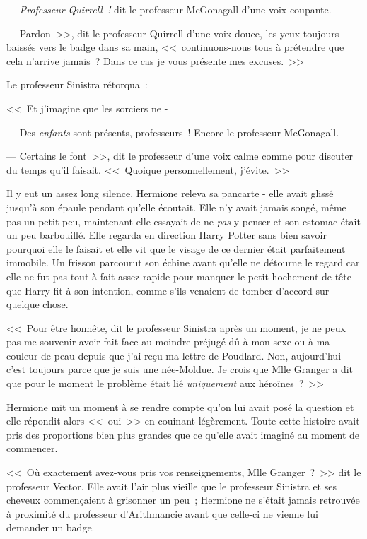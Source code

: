 --- \emph{Professeur Quirrell~!} dit le professeur McGonagall d'une voix coupante.

--- Pardon~>>, dit le professeur Quirrell d'une voix douce, les yeux toujours baissés vers le badge dans sa main, <<~continuons-nous tous à prétendre que cela n'arrive jamais~? Dans ce cas je vous présente mes excuses.~>>

Le professeur Sinistra rétorqua~:

<<~Et j'imagine que les sorciers ne -

--- Des \emph{enfants} sont présents, professeurs~! Encore le professeur McGonagall.

--- Certains le font~>>, dit le professeur d'une voix calme comme pour discuter du temps qu'il faisait. <<~Quoique personnellement, j'évite.~>>

Il y eut un assez long silence. Hermione releva sa pancarte - elle avait glissé jusqu'à son épaule pendant qu'elle écoutait. Elle n'y avait jamais songé, même pas un petit peu, maintenant elle essayait de ne \emph{pas} y penser et son estomac était un peu barbouillé. Elle regarda en direction Harry Potter sans bien savoir pourquoi elle le faisait et elle vit que le visage de ce dernier était parfaitement immobile. Un frisson parcourut son échine avant qu'elle ne détourne le regard car elle ne fut pas tout à fait assez rapide pour manquer le petit hochement de tête que Harry fit à son intention, comme s'ils venaient de tomber d'accord sur quelque chose.

<<~Pour être honnête, dit le professeur Sinistra après un moment, je ne peux pas me souvenir avoir fait face au moindre préjugé dû à mon sexe ou à ma couleur de peau depuis que j'ai reçu ma lettre de Poudlard. Non, aujourd'hui c'est toujours parce que je suis une née-Moldue. Je crois que Mlle Granger a dit que pour le moment le problème était lié \emph{uniquement} aux héroïnes~?~>>

Hermione mit un moment à se rendre compte qu'on lui avait posé la question et elle répondit alors <<~oui~>> en couinant légèrement. Toute cette histoire avait pris des proportions bien plus grandes que ce qu'elle avait imaginé au moment de commencer.

<<~Où exactement avez-vous pris vos renseignements, Mlle Granger~?~>> dit le professeur Vector. Elle avait l'air plus vieille que le professeur Sinistra et ses cheveux commençaient à grisonner un peu~; Hermione ne s'était jamais retrouvée à proximité du professeur d'Arithmancie avant que celle-ci ne vienne lui demander un badge.

